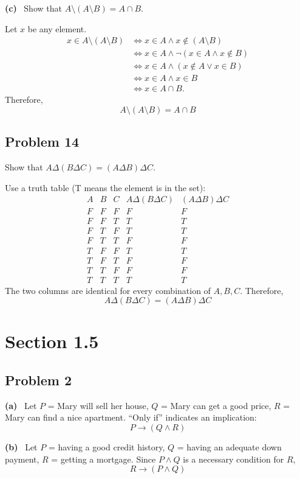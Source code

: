 \documentclass[11pt,a4paper]{article}
\newcommand{\sub}[1]{\par\medskip\textbf{(#1)}\ }
\begin{document}
\sub{c} Show that $A\setminus(A\setminus B)=A\cap B$.

Let $x$ be any element.
\begin{align*}
x\in A\setminus(A\setminus B) &\iff x\in A\land x\notin(A\setminus B)\\
&\iff x\in A\land\neg(x\in A\land x\notin B)\\
&\iff x\in A\land(x\notin A\lor x\in B)\\
&\iff x\in A\land x\in B\\
&\iff x\in A\cap B.
\end{align*}
Therefore,
\[
\boxed{A\setminus(A\setminus B)=A\cap B}
\]

\subsection*{Problem 14}
Show that $A\Delta(B\Delta C)=(A\Delta B)\Delta C$.

Use a truth table (T means the element is in the set):
\[
\begin{array}{ccc|c|c}
A&B&C&A\Delta(B\Delta C)&(A\Delta B)\Delta C\\
\hline
F&F&F&F&F\\
F&F&T&T&T\\
F&T&F&T&T\\
F&T&T&F&F\\
T&F&F&T&T\\
T&F&T&F&F\\
T&T&F&F&F\\
T&T&T&T&T
\end{array}
\]
The two columns are identical for every combination of $A,B,C$. Therefore,
\[
\boxed{A\Delta(B\Delta C)=(A\Delta B)\Delta C}
\]

\section*{Section 1.5}

\subsection*{Problem 2}

\sub{a} Let $P$ = Mary will sell her house, $Q$ = Mary can get a good price, $R$ = Mary can find a nice apartment. ``Only if'' indicates an implication:
\[
\boxed{P\to(Q\land R)}
\]

\sub{b} Let $P$ = having a good credit history, $Q$ = having an adequate down payment, $R$ = getting a mortgage. Since $P\land Q$ is a necessary condition for $R$,
\[
\boxed{R\to(P\land Q)}
\]
\end{document}
